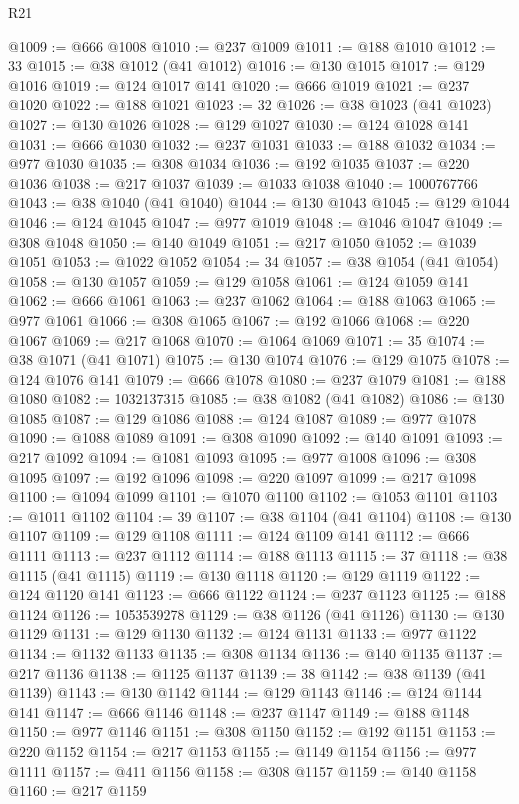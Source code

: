\begin{lexlean}{R21}
\begin{coremodule}
@1009 := @666 @1008
@1010 := @237 @1009
@1011 := @188 @1010
@1012 := 33
@1015 := @38 @1012 (@41 @1012)
@1016 := @130 @1015
@1017 := @129 @1016
@1019 := @124 @1017 @141
@1020 := @666 @1019
@1021 := @237 @1020
@1022 := @188 @1021
@1023 := 32
@1026 := @38 @1023 (@41 @1023)
@1027 := @130 @1026
@1028 := @129 @1027
@1030 := @124 @1028 @141
@1031 := @666 @1030
@1032 := @237 @1031
@1033 := @188 @1032
@1034 := @977 @1030
@1035 := @308 @1034
@1036 := @192 @1035
@1037 := @220 @1036
@1038 := @217 @1037
@1039 := @1033 @1038
@1040 := 1000767766
@1043 := @38 @1040 (@41 @1040)
@1044 := @130 @1043
@1045 := @129 @1044
@1046 := @124 @1045
@1047 := @977 @1019
@1048 := @1046 @1047
@1049 := @308 @1048
@1050 := @140 @1049
@1051 := @217 @1050
@1052 := @1039 @1051
@1053 := @1022 @1052
@1054 := 34
@1057 := @38 @1054 (@41 @1054)
@1058 := @130 @1057
@1059 := @129 @1058
@1061 := @124 @1059 @141
@1062 := @666 @1061
@1063 := @237 @1062
@1064 := @188 @1063
@1065 := @977 @1061
@1066 := @308 @1065
@1067 := @192 @1066
@1068 := @220 @1067
@1069 := @217 @1068
@1070 := @1064 @1069
@1071 := 35
@1074 := @38 @1071 (@41 @1071)
@1075 := @130 @1074
@1076 := @129 @1075
@1078 := @124 @1076 @141
@1079 := @666 @1078
@1080 := @237 @1079
@1081 := @188 @1080
@1082 := 1032137315
@1085 := @38 @1082 (@41 @1082)
@1086 := @130 @1085
@1087 := @129 @1086
@1088 := @124 @1087
@1089 := @977 @1078
@1090 := @1088 @1089
@1091 := @308 @1090
@1092 := @140 @1091
@1093 := @217 @1092
@1094 := @1081 @1093
@1095 := @977 @1008
@1096 := @308 @1095
@1097 := @192 @1096
@1098 := @220 @1097
@1099 := @217 @1098
@1100 := @1094 @1099
@1101 := @1070 @1100
@1102 := @1053 @1101
@1103 := @1011 @1102
@1104 := 39
@1107 := @38 @1104 (@41 @1104)
@1108 := @130 @1107
@1109 := @129 @1108
@1111 := @124 @1109 @141
@1112 := @666 @1111
@1113 := @237 @1112
@1114 := @188 @1113
@1115 := 37
@1118 := @38 @1115 (@41 @1115)
@1119 := @130 @1118
@1120 := @129 @1119
@1122 := @124 @1120 @141
@1123 := @666 @1122
@1124 := @237 @1123
@1125 := @188 @1124
@1126 := 1053539278
@1129 := @38 @1126 (@41 @1126)
@1130 := @130 @1129
@1131 := @129 @1130
@1132 := @124 @1131
@1133 := @977 @1122
@1134 := @1132 @1133
@1135 := @308 @1134
@1136 := @140 @1135
@1137 := @217 @1136
@1138 := @1125 @1137
@1139 := 38
@1142 := @38 @1139 (@41 @1139)
@1143 := @130 @1142
@1144 := @129 @1143
@1146 := @124 @1144 @141
@1147 := @666 @1146
@1148 := @237 @1147
@1149 := @188 @1148
@1150 := @977 @1146
@1151 := @308 @1150
@1152 := @192 @1151
@1153 := @220 @1152
@1154 := @217 @1153
@1155 := @1149 @1154
@1156 := @977 @1111
@1157 := @411 @1156
@1158 := @308 @1157
@1159 := @140 @1158
@1160 := @217 @1159

\end{coremodule}
\end{lexlean}

